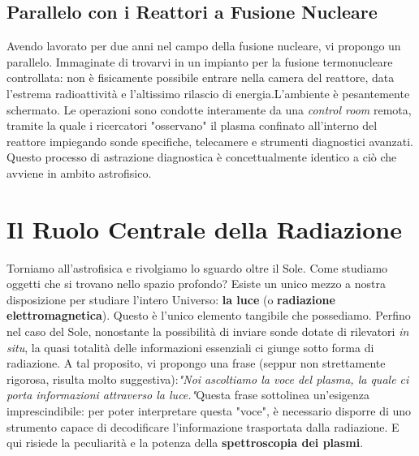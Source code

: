     \subsection{Parallelo con i Reattori a Fusione Nucleare}
    Avendo lavorato per due anni nel campo della fusione nucleare, vi propongo un parallelo. Immaginate di trovarvi in un impianto per la fusione termonucleare controllata: non è fisicamente possibile entrare nella camera del reattore, data l'estrema radioattività e l'altissimo rilascio di energia.L'ambiente è pesantemente schermato. Le operazioni sono condotte interamente da una \textit{control room} remota, tramite la quale i ricercatori "osservano" il plasma confinato all'interno del reattore impiegando sonde specifiche, telecamere e strumenti diagnostici avanzati. Questo processo di astrazione diagnostica è concettualmente identico a ciò che avviene in ambito astrofisico.\section{Il Ruolo Centrale della Radiazione}Torniamo all'astrofisica e rivolgiamo lo sguardo oltre il Sole. Come studiamo oggetti che si trovano nello spazio profondo? Esiste un unico mezzo a nostra disposizione per studiare l'intero Universo: \textbf{la luce} (o \textbf{radiazione elettromagnetica}). Questo è l'unico elemento tangibile che possediamo. Perfino nel caso del Sole, nonostante la possibilità di inviare sonde dotate di rilevatori \textit{in situ}, la quasi totalità delle informazioni essenziali ci giunge sotto forma di radiazione. A tal proposito, vi propongo una frase (seppur non strettamente rigorosa, risulta molto suggestiva):\textit{"Noi ascoltiamo la voce del plasma, la quale ci porta informazioni attraverso la luce."}Questa frase sottolinea un'esigenza imprescindibile: per poter interpretare questa "voce", è necessario disporre di uno strumento capace di decodificare l'informazione trasportata dalla radiazione. E qui risiede la peculiarità e la potenza della \textbf{spettroscopia dei plasmi}.
    
